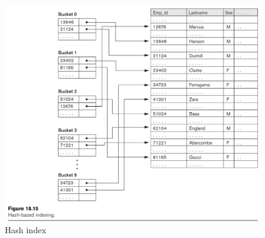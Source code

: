 \documentclass[indexstructuren.tex]{subfiles}
\begin{document}
\begin{figure}[H]
\includegraphics[width=\linewidth]{illustraties/hash_index.png}
\caption{Hash index}
\end{figure}
\end{document}
